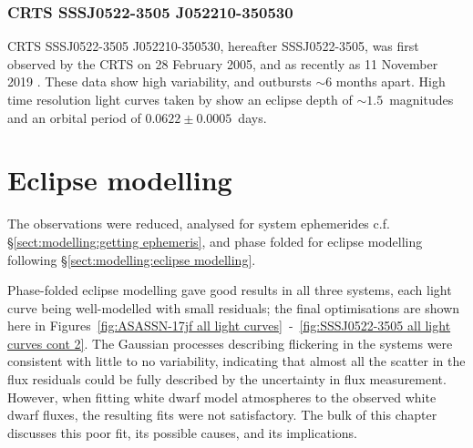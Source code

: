 \subsubsection{CRTS SSSJ0522-3505 J052210-350530}
\label{sect:three white dwarfs:SSSJ0522-3505 prior observations}
CRTS SSSJ0522-3505 J052210-350530, hereafter SSSJ0522-3505, was first observed by the CRTS on 28 February 2005, and as recently as 11 November 2019 \citep{drake2009}. These data show high variability, and outbursts $\sim$6 months apart. High time resolution light curves taken by \citet{paterson2019} show an eclipse depth of $\sim1.5$\ magnitudes and an orbital period of $0.0622 \pm 0.0005$\ days.


\section{Eclipse modelling}
\label{sect:three white dwarfs:eclipse modelling results}

The observations were reduced, analysed for system ephemerides c.f. \S\ref{sect:modelling:getting ephemeris}, and phase folded for eclipse modelling following \S\ref{sect:modelling:eclipse modelling}.

Phase-folded eclipse modelling gave good results in all three systems, each light curve being well-modelled with small residuals; the final optimisations are shown here in Figures~\ref{fig:ASASSN-17jf all light curves}~-~\ref{fig:SSSJ0522-3505 all light curves cont 2}.
The Gaussian processes describing flickering in the systems were consistent with little to no variability, indicating that almost all the scatter in the flux residuals could be fully described by the uncertainty in flux measurement.
However, when fitting white dwarf model atmospheres to the observed white dwarf fluxes, the resulting fits were not satisfactory. The bulk of this chapter discusses this poor fit, its possible causes, and its implications.



